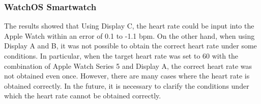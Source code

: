 \documentclass[sigchi,authordraft]{acmart}
\newcommand\tabref[1]{\textbf{Table~\ref{tab:#1}}}
\begin{document}
\subsubsection{WatchOS Smartwatch}
The results showed that Using Display C, the heart rate could be input into the Apple Watch within an error of 0.1 to -1.1 bpm. On the other hand, when using Display A and B, it was not possible to obtain the correct heart rate under some conditions. In particular, when the target heart rate was set to 60 with the combination of Apple Watch Series 5 and Display A, the correct heart rate was not obtained even once. However, there are many cases where the heart rate is obtained correctly. In the future, it is necessary to clarify the conditions under which the heart rate cannot be obtained correctly.
\end{document}
